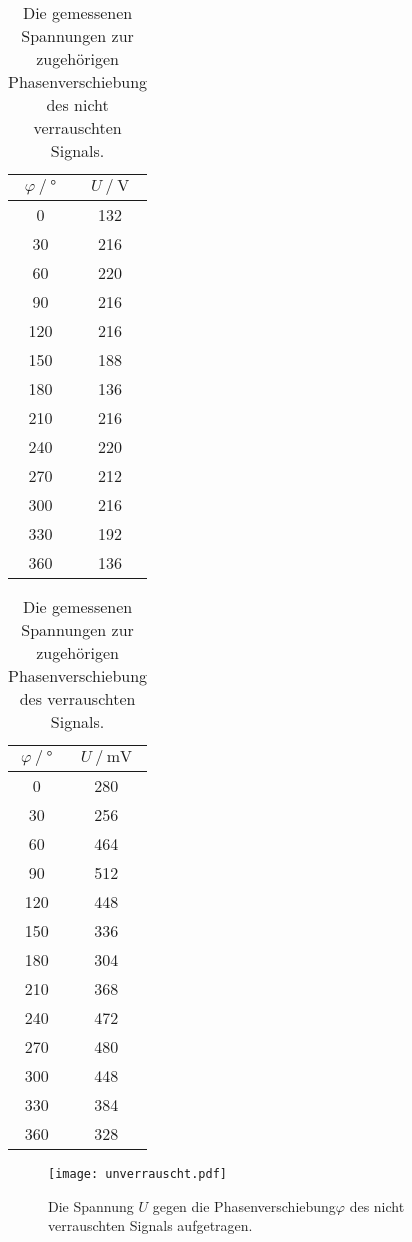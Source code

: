 \begin{table}
  \centering
  \caption{Die gemessenen Spannungen zur zugehörigen Phasenverschiebung des nicht verrauschten Signals.}
  \begin{tabular}{cc}
    \toprule
    {$\varphi \mathbin{/} °$} &
    {$U \mathbin{/} \unit{\volt}$} \\
    \midrule
      0 & 132\\
      30 & 216\\
      60 & 220\\
      90 & 216\\
      120 & 216\\
      150 & 188\\
      180 & 136\\
      210 & 216\\
      240 & 220\\
      270 & 212\\
      300 & 216\\
      330 & 192\\
      360 & 136\\
    \bottomrule
  \end{tabular}
  \label{tab:DatenUnverrauscht}
\end{table}
\begin{table}[H]
  \centering
  \caption{Die gemessenen Spannungen zur zugehörigen Phasenverschiebung des verrauschten Signals.}
  \begin{tabular}{cc}
    \toprule
    {$\varphi \mathbin{/} °$} &
    {$U \mathbin{/} \unit{\milli\volt}$} \\
    \midrule
      0 & 280\\
      30 & 256\\
      60 & 464\\
      90 & 512\\
      120 & 448\\
      150 & 336\\
      180 & 304\\
      210 & 368\\
      240 & 472\\
      270 & 480\\
      300 & 448\\
      330 & 384\\
      360 & 328\\
    \bottomrule
  \end{tabular}
  \label{tab:DatenVerrauscht}
\end{table}
\begin{figure}[H]
  \centering
  \texttt{[image: unverrauscht.pdf]}
  \caption{Die Spannung $U$ gegen die Phasenverschiebung$\varphi$ des nicht verrauschten Signals aufgetragen.}
  \label{fig:unverrauscht}
\end{figure}
